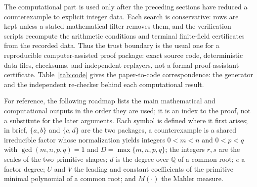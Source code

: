\documentclass[11pt]{article}
\numberwithin{equation}{section}
\theoremstyle{definition}
\newcommand{\Q}{\mathbb Q}
\begin{document}
The computational part is used only after the preceding sections have reduced
a counterexample to explicit integer data.  Each search is conservative: rows
are kept unless a stated mathematical filter removes them, and the verification
scripts recompute the arithmetic conditions and terminal finite-field
certificates from the recorded data.  Thus the trust boundary is the usual one
for a reproducible computer-assisted proof package: exact source code,
deterministic data files, checksums, and independent replayers, not a formal
proof-assistant certificate.  Table~\ref{tab:code} gives the paper-to-code
correspondence: the generator and the independent re-checker behind each
computational result.

For reference, the following roadmap lists the main mathematical and
computational outputs in the order they are used; it is an index to the proof,
not a substitute for the later arguments.  Each symbol is defined where it
first arises; in brief, \(\{a,b\}\) and \(\{c,d\}\) are the two packages, a
counterexample is a shared irreducible factor whose normalization yields
integers \(0<m<n\) and \(0<p<q\) with \(\gcd(m,n,p,q)=1\) and
\(D=\max\{m,n,p,q\}\); the integers \(r,s\) are the scales of the two
primitive shapes; \(d\) is the degree over \(\Q\) of a common root; \(e\) a
factor degree; \(U\) and \(V\) the leading and constant coefficients of the
primitive minimal polynomial of a common root; and \(M(\cdot)\) the Mahler
measure.
\end{document}
